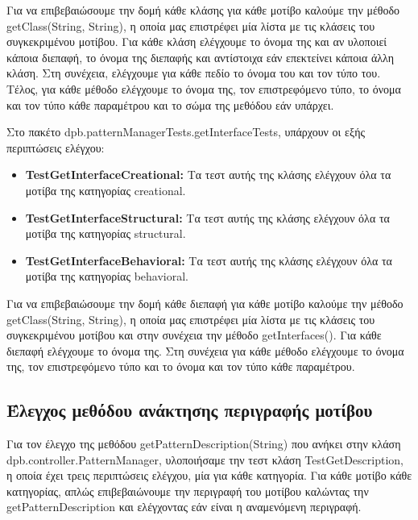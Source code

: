\par
Για να επιβεβαιώσουμε την δομή κάθε κλάσης για κάθε μοτίβο καλούμε την μέθοδο getClass(String, String), η οποία μας επιστρέφει 
μία λίστα με τις κλάσεις του συγκεκριμένου μοτίβου. Για κάθε κλάση ελέγχουμε το όνομα της και αν υλοποιεί κάποια διεπαφή, 
το όνομα της διεπαφής και αντίστοιχα εάν επεκτείνει κάποια άλλη κλάση. Στη συνέχεια, ελέγχουμε για κάθε πεδίο το όνομα του και 
τον τύπο του. Τέλος, για κάθε μέθοδο ελέγχουμε το όνομα της, τον επιστρεφόμενο τύπο, 
το όνομα και τον τύπο κάθε παραμέτρου και το σώμα της μεθόδου εάν υπάρχει.
\par
Στο πακέτο dpb.patternManagerTests.getInterfaceTests, υπάρχουν οι εξής περιπτώσεις ελέγχου:
\begin{itemize}
    \item \textbf{TestGetInterfaceCreational:} Τα τεστ αυτής της κλάσης ελέγχουν όλα τα μοτίβα της κατηγορίας creational.
    \item \textbf{TestGetInterfaceStructural:} Τα τεστ αυτής της κλάσης ελέγχουν όλα τα μοτίβα της κατηγορίας structural.
    \item \textbf{TestGetInterfaceBehavioral:} Τα τεστ αυτής της κλάσης ελέγχουν όλα τα μοτίβα της κατηγορίας behavioral.
\end{itemize}
\par
Για να επιβεβαιώσουμε την δομή κάθε διεπαφή για κάθε μοτίβο καλούμε την μέθοδο getClass(String, String), η οποία μας επιστρέφει 
μία λίστα με τις κλάσεις του συγκεκριμένου μοτίβου και στην συνέχεια την μέθοδο getInterfaces(). Για κάθε διεπαφή 
ελέγχουμε το όνομα της. Στη συνέχεια για κάθε μέθοδο ελέγχουμε το όνομα της, τον επιστρεφόμενο τύπο και
το όνομα και τον τύπο κάθε παραμέτρου.
\subsection{Έλεγχος μεθόδου ανάκτησης περιγραφής μοτίβου}
\label{subsec:getDescriptionTest}
Για τον έλεγχο της μεθόδου getPatternDescription(String) που ανήκει στην κλάση dpb.controller.PatternManager, υλοποιήσαμε την τεστ κλάση
TestGetDescription, η οποία έχει τρεις περιπτώσεις ελέγχου, μία για κάθε κατηγορία. Για κάθε μοτίβο κάθε κατηγορίας,
απλώς επιβεβαιώνουμε την περιγραφή του μοτίβου καλώντας την getPatternDescription και ελέγχοντας εάν είναι η αναμενόμενη περιγραφή.
